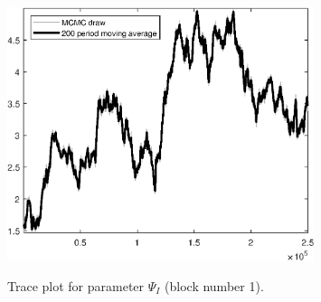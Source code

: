 \begin{figure}[H]
\centering
  \includegraphics[width=0.8\textwidth]{BRS_aggregate/graphs/TracePlot_Psi_I_blck_1}\\
    \caption{Trace plot for parameter ${\Psi_I}$ (block number 1).}
\end{figure}
